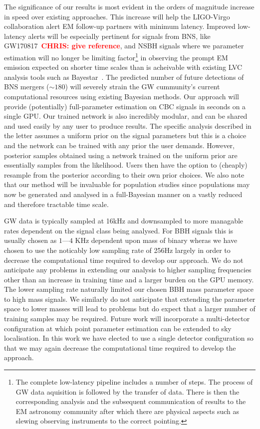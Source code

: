\documentclass[%
showpacs,
 amsmath,amssymb,
 aps,
 twocolumn,
 prl,
 reprint,
floatfix,
]{revtex4-1}
\newcommand{\chris}[1]{\textbf{\textcolor{red}{CHRIS: #1}}}
\begin{document}
%
%
The significance of our results is most evident in the orders of magnitude
increase in speed over existing approaches. This increase will help the
LIGO-Virgo collaboration alert \ac{EM} follow-up partners with minimum latency.
Improved low-latency alerts will be especially pertinent for signals from
\ac{BNS}, like GW170817~\chris{give reference}, and \ac{NSBH} signals where we
parameter estimation will no longer be limiting factor\footnote{The complete
low-latency pipeline includes a number of steps. The process of \ac{GW} data
aquisition is followed by the transfer of data. There is then the corresponding
analysis and the subsequent communication of results to the \ac{EM} astronomy
community after which there are physical aspects such as slewing observing
instruments to the correct pointing.} in observing the prompt \ac{EM} emission
expected on shorter time scales than is acheivable with existing \ac{LVC}
analysis tools such as Bayestar~\cite{2016PhRvD..93b4013S}. The predicted number of
future detections of \ac{BNS} mergers ($\sim 180$) will severely
strain the \ac{GW} cummunity's current computational resources using existing
Bayesian methods. Our approach will provide (potentially) full-parameter
estimation on \ac{CBC} signals in seconds on a single \ac{GPU}. Our trained
network is also incredibly modular, and can be shared and used easily by any
user to produce results. The specific analysis described in the letter assumes
a uniform prior on the signal parameters but this is a choice and the network
can be trained with any prior the user demands. However, posterior samples
obtained using a network trained on the uniform prior are essentially samples
from the likelihood. Users then have the option to (cheaply) resample from the
posterior according to their own prior choices. We also note that our method
will be invaluable for population studies since populations may now be
generated and analysed in a full-Bayesian manner on a vastly reduced and
therefore tractable time scale. 

%
%
\ac{GW} data is typically sampled at 16kHz and downsampled to more managable
rates dependent on the signal class being analysed. For \ac{BBH} signals this
is usually chosen as $1$---$4$ KHz dependent upon mass of binary wheras we have
chosen to use the noticably low sampling rate of 256Hz largely in order to
decrease the computational time required to develop our approach. We do not
anticipate any problems in extending our analysis to higher sampling
frequencies other than an increase in training time and a larger burden on the
\ac{GPU} memory. The lower sampling rate naturally limited our chosen \ac{BBH}
mass parameter space to high mass signals. We similarly do not anticipate that
extending the parameter space to lower masses will lead to problems but do
expect that a larger number of training samples may be required. Future work
will incorporate a multi-detector configuration at which point parameter
estimation can be extended to sky localisation. In this work we have elected to
use a single detector configuration so that we may again decrease the
computational time required to develop the approach.
\end{document}
